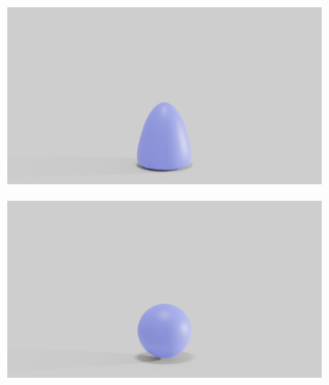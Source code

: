\begin{figure}[htp!]
\begin{subfigure}{.16\linewidth}
		\label{sfig:ball-045-5}
	\end{subfigure}%
	\begin{subfigure}{.16\linewidth}
		\centering
		{\includegraphics[width=2.0\textwidth]{images/soft_ball/045/0450.jpg}}
		\label{sfig:ball-045-6}
	\end{subfigure}\hfill
	\begin{subfigure}{.03\linewidth}
	\end{subfigure}%
	\begin{subfigure}{.16\linewidth}
		\centering
		{\includegraphics[width=2.0\textwidth]{images/soft_ball/0495/0200.jpg}}
		\label{sfig:ball-0495-1}
	\end{subfigure}%
	\begin{subfigure}{.16\linewidth}
		\centering

\end{subfigure}
\end{figure}

